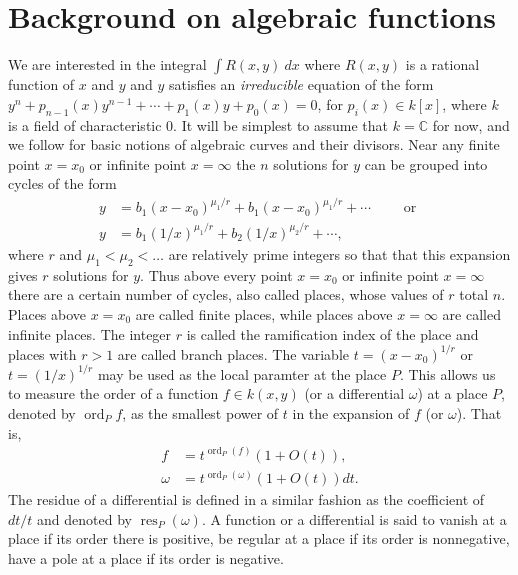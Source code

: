 \documentclass[12pt,reqno]{amsart}
\numberwithin{equation}{section}
\newcommand{\op}[1]  { \operatorname{ #1 }}
\begin{document}
\section{Background on algebraic functions}
\label{section_background}
We are interested in the integral $ \int R(x,y) \ dx$ where $R(x,y)$ is a rational function of $x$ and $y$ and $y$ satisfies an \emph{irreducible} equation of the form $y^n+p_{n-1}(x)y^{n-1}+ \cdots +p_1(x)y+p_0(x)=0$, for $p_i(x) \in k[x]$, where $k$ is a field of characteristic $0$. It will be simplest to assume that $k= \mathbb{C}$ for now, and we follow \cite{bliss} for basic notions of algebraic curves and their divisors. Near any finite point $x=x_0$ or infinite point $x=\infty$ the $n$ solutions for $y$ can be grouped into cycles of the form
\begin{equation}
\label{equ_pseries} 
\begin{alignedat}{5}
 y&=b_1 (x-x_0)^{\mu_1/r}+b_1 (x-x_0)^{\mu_1/r}+ \cdots \quad \quad \text{ or }\\
 y&=b_1(1/x)^{\mu_1/r}+b_2(1/x)^{\mu_2/r}+\cdots \text{,}
\end{alignedat}
\end{equation}
where $r$ and $\mu_1 < \mu_2<\dots$ are relatively prime integers so that that this expansion gives $r$ solutions for $y$. Thus above every point $x=x_0$ or infinite point $x=\infty$ there are a certain number of cycles, also called places, whose values of $r$ total $n$. Places above $x=x_0$ are called finite places, while places above $x=\infty$ are called infinite places. The integer $r$ is called the ramification index of the place and places with $r>1$ are called branch places. The variable $t=(x-x_0)^{1/r}$ or $t=(1/x)^{1/r}$ may be used as the local paramter at the place $P$. This allows us to measure the order of a function $f \in k(x,y)$ (or a differential $\omega$) at a place $P$, denoted by $ \operatorname{ord}_P f$, as the smallest power of $t$ in the expansion of $f$ (or $\omega$). That is,
\begin{align*}
 f &= t^{\op{ord}_{P}(f)} (1+ O(t))\text{,}\\
 \omega &= t^{\op{ord}_{P}(\omega)} (1+ O(t)) dt\text{.}
\end{align*}
The residue of a differential is defined in a similar fashion as the coefficient of $dt/t$ and denoted by $\op{res}_P(\omega)$. A function or a differential is said to vanish at a place if its order there is positive, be regular at a place if its order is nonnegative, have a pole at a place if its order is negative.
\end{document}
